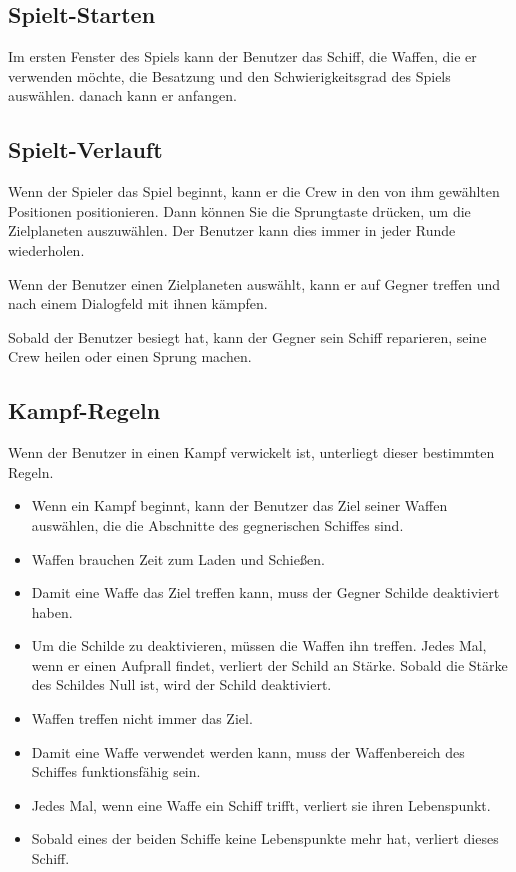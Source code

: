 \documentclass[fontsize=12pt,paper=a4,twoside]{scrartcl}
\begin{document}
\subsection{Spielt-Starten}
Im ersten Fenster des Spiels kann der Benutzer das Schiff, die Waffen, die er verwenden möchte, die Besatzung und den Schwierigkeitsgrad des Spiels auswählen. danach kann er anfangen.
\subsection{Spielt-Verlauft}
Wenn der Spieler das Spiel beginnt, kann er die Crew in den von ihm gewählten Positionen positionieren. Dann können Sie die Sprungtaste drücken, um die Zielplaneten auszuwählen. Der Benutzer kann dies immer in jeder Runde wiederholen.

Wenn der Benutzer einen Zielplaneten auswählt, kann er auf Gegner treffen und nach einem Dialogfeld mit ihnen kämpfen.

Sobald der Benutzer besiegt hat, kann der Gegner sein Schiff reparieren, seine Crew heilen oder einen Sprung machen.

\subsection{Kampf-Regeln}
Wenn der Benutzer in einen Kampf verwickelt ist, unterliegt dieser bestimmten Regeln.
\begin{itemize}
\item Wenn ein Kampf beginnt, kann der Benutzer das Ziel seiner Waffen auswählen, die die Abschnitte des gegnerischen Schiffes sind.
 
\item Waffen brauchen Zeit zum Laden und Schießen.

\item Damit eine Waffe das Ziel treffen kann, muss der Gegner Schilde deaktiviert haben.

\item Um die Schilde zu deaktivieren, müssen die Waffen ihn treffen. Jedes Mal, wenn er einen Aufprall findet, verliert der Schild an Stärke. Sobald die Stärke des Schildes Null ist, wird der Schild deaktiviert.

\item Waffen treffen nicht immer das Ziel.

\item Damit eine Waffe verwendet werden kann, muss der Waffenbereich des Schiffes funktionsfähig sein.

\item Jedes Mal, wenn eine Waffe ein Schiff trifft, verliert sie ihren Lebenspunkt.

\item Sobald eines der beiden Schiffe keine Lebenspunkte mehr hat, verliert dieses Schiff.
\end{itemize}
\end{document}
